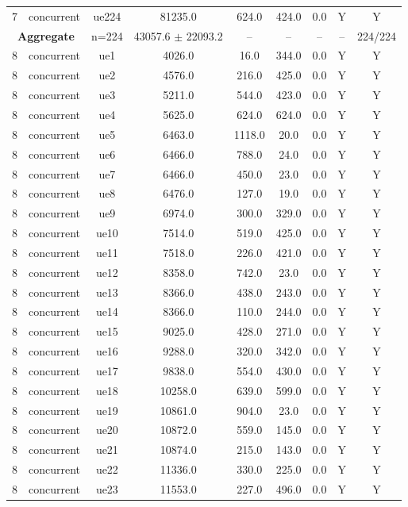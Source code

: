\begin{table}[ht]
\begin{tabular}{|c|c|c|c|c|c|c|c|c|}
7 & concurrent & ue224 & 81235.0 & 624.0 & 424.0 & 0.0 & Y & Y \\
\multicolumn{2}{|c|}{\textbf{Aggregate}} & n=224 & 43057.6 $\pm$ 22093.2 & -- & -- & -- & -- & 224/224 \\
\hline
8 & concurrent & ue1 & 4026.0 & 16.0 & 344.0 & 0.0 & Y & Y \\
8 & concurrent & ue2 & 4576.0 & 216.0 & 425.0 & 0.0 & Y & Y \\
8 & concurrent & ue3 & 5211.0 & 544.0 & 423.0 & 0.0 & Y & Y \\
8 & concurrent & ue4 & 5625.0 & 624.0 & 624.0 & 0.0 & Y & Y \\
8 & concurrent & ue5 & 6463.0 & 1118.0 & 20.0 & 0.0 & Y & Y \\
8 & concurrent & ue6 & 6466.0 & 788.0 & 24.0 & 0.0 & Y & Y \\
8 & concurrent & ue7 & 6466.0 & 450.0 & 23.0 & 0.0 & Y & Y \\
8 & concurrent & ue8 & 6476.0 & 127.0 & 19.0 & 0.0 & Y & Y \\
8 & concurrent & ue9 & 6974.0 & 300.0 & 329.0 & 0.0 & Y & Y \\
8 & concurrent & ue10 & 7514.0 & 519.0 & 425.0 & 0.0 & Y & Y \\
8 & concurrent & ue11 & 7518.0 & 226.0 & 421.0 & 0.0 & Y & Y \\
8 & concurrent & ue12 & 8358.0 & 742.0 & 23.0 & 0.0 & Y & Y \\
8 & concurrent & ue13 & 8366.0 & 438.0 & 243.0 & 0.0 & Y & Y \\
8 & concurrent & ue14 & 8366.0 & 110.0 & 244.0 & 0.0 & Y & Y \\
8 & concurrent & ue15 & 9025.0 & 428.0 & 271.0 & 0.0 & Y & Y \\
8 & concurrent & ue16 & 9288.0 & 320.0 & 342.0 & 0.0 & Y & Y \\
8 & concurrent & ue17 & 9838.0 & 554.0 & 430.0 & 0.0 & Y & Y \\
8 & concurrent & ue18 & 10258.0 & 639.0 & 599.0 & 0.0 & Y & Y \\
8 & concurrent & ue19 & 10861.0 & 904.0 & 23.0 & 0.0 & Y & Y \\
8 & concurrent & ue20 & 10872.0 & 559.0 & 145.0 & 0.0 & Y & Y \\
8 & concurrent & ue21 & 10874.0 & 215.0 & 143.0 & 0.0 & Y & Y \\
8 & concurrent & ue22 & 11336.0 & 330.0 & 225.0 & 0.0 & Y & Y \\
8 & concurrent & ue23 & 11553.0 & 227.0 & 496.0 & 0.0 & Y & Y \\

\end{tabular}
\end{table}

